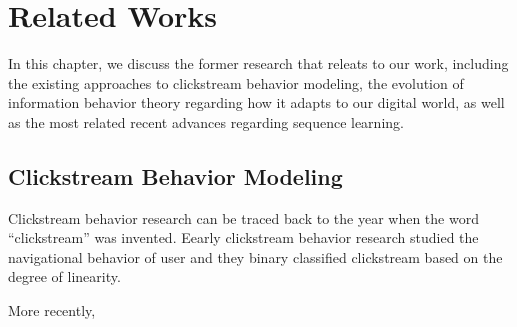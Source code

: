 \section{Related Works}
\label{ch:relate}


In this chapter, we discuss the former research that releats to our work, including
the existing approaches to clickstream behavior modeling, the evolution of information 
behavior theory regarding how it adapts to our digital world, as well as the 
most related recent advances regarding sequence learning.

\subsection{Clickstream Behavior Modeling}

Clickstream behavior research can be traced back to the year when the word ``clickstream''
was invented. Eearly clickstream behavior research studied the navigational behavior
of user \cite{mandese1995clickstreams, brodwin1995} and 
they binary classified clickstream based on the degree of linearity.

More recently, 






